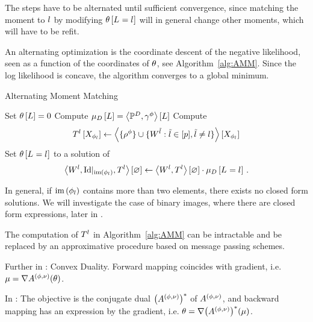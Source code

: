 The steps have to be alternated until sufficient convergence, since matching the moment to $l$ by modifying $\theta\left[L_{}=l_{}\right]$ will in general change other moments, which will have to be refit.


An alternating optimization is the coordinate descent of the negative likelihood, seen as a function of the coordinates of $\theta$, see Algorithm~\ref{alg:AMM}.
Since the log likelihood is concave, the algorithm converges to a global minimum.



\begin{algorithm}[h!]
\caption{Alternating Moment Matching}\label{alg:AMM}
\begin{algorithmic}
\State Set $\theta\left[L\right]=0$
\State Compute $\mu_{D}\left[L\right]= \left\langle \mathbb{P}^{D},\gamma^{\phi}\right\rangle \left[ L \right]$
{}
\For{$\selindexin$}
	\State Compute 
		\begin{align*}
			T^{l}\left[X_{\phi_{l}}\right] 
			\leftarrow \left\langle \{\rho^{\phi}\}\cup\{W^{\tilde{l}} : \tilde{l} \in [p], \tilde{l}\neq l\}\right\rangle \left[ X_{\phi_{l}} \right] 
		\end{align*}
	\State Set $\theta\left[L_{}=l_{}\right]$ to a solution of 
	\begin{align*}
		\left\langle W^{l},{\mathrm{Id}}|_{\mathrm{im}\left(\phi_{l}\right)},T^{l}\right\rangle \left[ \varnothing \right]
		\leftarrow \left\langle W^{l},T^{l}\right\rangle \left[ \varnothing \right] \cdot \mu_{D}\left[L_{}=l_{}\right] \, . 
	\end{align*}
\EndFor
\EndWhile
\end{algorithmic}
\end{algorithm}


% 
In general, if $\mathrm{im}\left(\phi_{l}\right)$ contains more than two elements, there exists no closed form solutions.
We will investigate the case of binary images, where there are closed form expressions, later in .


%
The computation of $T^{l}$ in Algorithm~\ref{alg:AMM} can be intractable and be replaced by an approximative procedure based on message passing schemes.


Further in \cite{wainwright_graphical_2008}: Convex Duality.
Forward mapping coincides with gradient, i.e. $\mu = \nabla A^{(\phi,\nu)}(\theta)$.

In \cite{wainwright_graphical_2008}:
The objective is the conjugate dual $\big(A^{(\phi,\nu)}\big)^*$ of $A^{(\phi,\nu)}$, and backward mapping has an expression by the gradient, i.e. $\theta = \nabla \big(A^{(\phi,\nu)}\big)^*(\mu)$.


